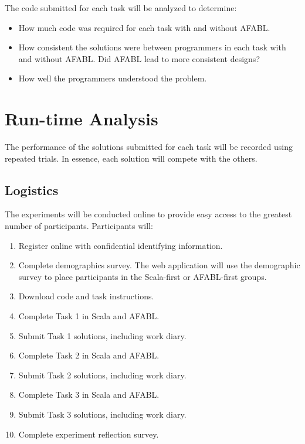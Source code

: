 The code submitted for each task will be analyzed to determine:

\begin{itemize}
\item How much code was required for each task with and without AFABL.
\item How consistent the solutions were between programmers in each task with and without AFABL.  Did AFABL lead to more consistent designs?
\item How well the programmers understood the problem.
\end{itemize}

\section{Run-time Analysis}

The performance of the solutions submitted for each task will be recorded using repeated trials.  In essence, each solution will compete with the others.

\subsection{Logistics}

The experiments will be conducted online to provide easy access to the greatest number of participants.  Participants will:

\begin{enumerate}
\item Register online with confidential identifying information.
\item Complete demographics survey.  The web application will use the demographic survey to place participants in the Scala-first or AFABL-first groups.
\item Download code and task instructions.
\item Complete Task 1 in Scala and AFABL.
\item Submit Task 1 solutions, including work diary.
\item Complete Task 2 in Scala and AFABL.
\item Submit Task 2 solutions, including work diary.
\item Complete Task 3 in Scala and AFABL.
\item Submit Task 3 solutions, including work diary.
\item Complete experiment reflection survey.
\end{enumerate}

